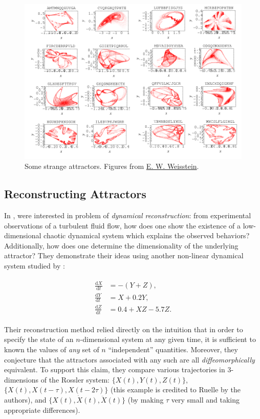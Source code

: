 \documentclass[12pt]{article}
\theoremstyle{definition}
\theoremstyle{remark}
\newcommand{\speccite}[1]{\citetitle{#1} \parencite{#1}}
\newcommand{\dt}[1]{\frac{\mathrm d #1}{\mathrm d t}}
\begin{document}
\begin{figure}[H]
    \centering
    \includegraphics[scale=0.6]{figures/strange_attractors.png}
    \caption{Some strange attractors. Figures from \href{http://mathworld.wolfram.com/StrangeAttractor.html}{E. W. Weisstein}.}
\end{figure}

\subsection{Reconstructing Attractors}
In \speccite{packard1980geometry}, \citeauthor{packard1980geometry} were interested in problem of \textit{dynamical reconstruction}: from experimental observations of a turbulent fluid flow, how does one show the existence of a low-dimensional chaotic dynamical system which explains the observed behaviors? Additionally, how does one determine the dimensionality of the underlying attractor? They demonstrate their ideas using another non-linear dynamical system studied by \parencite{rossler1976equation}:

\begin{align}
    \label{rossler}
    \begin{split}
        \dt{X} &= - ( Y + Z ), \\
        \dt{Y} &= X + 0.2 Y, \\
        \dt{Z} &= 0.4 + XZ - 5.7 Z.
    \end{split}
\end{align}

Their reconstruction method relied directly on the intuition that in order to specify the state of an $n$-dimensional system at any given time, it is sufficient to known the values of \textit{any} set of $n$ ``independent'' quantities. Moreover, they conjecture that the attractors associated with any such are all \textit{diffeomorphically} equivalent. To support this claim, they compare various trajectories in $3$-dimensions of the Rossler system: $\{ X(t), Y(t), Z(t)\}$, $\{ X(t), X(t - \tau), X(t - 2 \tau)\}$ (this example is credited to Ruelle by the authors), and $\{ X(t), \dot X(t), \ddot X(t) \}$ (by making $\tau$ very small and taking appropriate differences).
\end{document}
